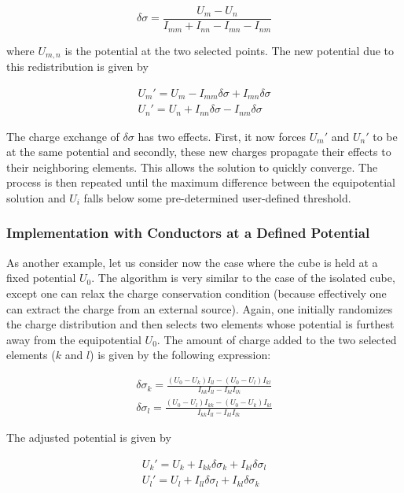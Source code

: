\begin{equation}
\delta \sigma = \frac{U_m - U_n}{I_{mm} + I_{nn} - I_{mn} - I_{nm}}
\end{equation}

\noindent where $U_{m,n}$ is the potential at the two selected points. The new potential due to this redistribution is given by

\begin{eqnarray}
U_m' = U_m - I_{mm}\delta \sigma + I_{mn}\delta \sigma\\
U_n' = U_n + I_{nn}\delta \sigma - I_{nm}\delta \sigma
\end{eqnarray}

The charge exchange of $\delta \sigma$ has two effects. First, it now forces $U_m'$ and $U_n'$ to be at the same potential and secondly, these new charges propagate their effects to their neighboring elements.  This allows the solution to quickly converge.  The process is then repeated until the maximum difference between the equipotential solution and $U_i$ falls below some pre-determined user-defined threshold.

\subsubsection{Implementation with Conductors at a Defined Potential}

As another example, let us consider now the case where the cube is held at a fixed potential $U_0$.  The algorithm is very similar to the case of the isolated cube, except one can relax the charge conservation condition (because effectively one can extract the charge from an external source).  Again, one initially randomizes the charge distribution and then selects two elements whose potential is furthest away from the equipotential $U_0$.  The amount of charge added to the two selected elements ($k$ and $l$) is given by the following expression:

\begin{eqnarray}
\delta \sigma_k = \frac{(U_0 - U_k)I_{ll} - (U_0-U_l)I_{kl}}{I_{kk} I_{ll} -I_{kl}I_{lk}}\\
\delta \sigma_l = \frac{(U_0 - U_l)I_{kk} - (U_0-U_k)I_{kl}}{I_{kk} I_{ll} -I_{kl}I_{lk}}
\end{eqnarray}

The adjusted potential is given by 

\begin{eqnarray}
\label{eq:charge_exchange}
U_k' = U_k + I_{kk} \delta \sigma_k + I_{kl} \delta \sigma_l \\
U_l' = U_l + I_{ll} \delta \sigma_l + I_{kl} \delta \sigma_k
\end{eqnarray}


